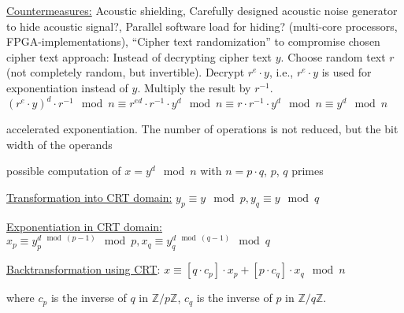 \documentclass[landscape, a4paper]{article}
\begin{document}
\begin{minipage}[t]{0.2\linewidth}
\begin{betterlist}
\begin{betterlist}
		\end{betterlist}
		\item \underline{Countermeasures:} Acoustic shielding, Carefully designed acoustic noise generator to hide acoustic signal?, Parallel software load for hiding? (multi-core processors, FPGA-implementations), \enquote{Cipher text randomization} to compromise chosen cipher text approach: Instead of decrypting cipher text $y$. Choose random text $r$ (not completely random, but invertible). Decrypt $r^e \cdot y$, i.e., $r^e \cdot y$ is used for exponentiation instead of $y$. Multiply the result by $r^{−1}$. $(r^e \cdot y)^d \cdot r^{−1} \mod n \equiv r^{ed} \cdot r^{−1} \cdot y^d \mod n \equiv r \cdot r^{−1} \cdot y^d \mod n \equiv y^d \mod n$
	\end{betterlist}
	\begin{betterlist}
		\item accelerated exponentiation. The number of operations is not reduced, but the bit width of the operands
		\item possible computation of $x = y^d \mod n$ with $n = p \cdot q$, $p$, $q$ primes
		\begin{betterlist}
			\item \underline{Transformation into CRT domain:} $y_p \equiv y \mod p, y_q \equiv y \mod q$
			\item \underline{Exponentiation in CRT domain:}\\
			$x_p \equiv y_p^{d \mod (p-1)} \mod p, x_q \equiv y_q^{d \mod (q-1)} \mod q$
			\item \underline{Backtransformation using CRT}: $x \equiv [q \cdot c_p] \cdot x_p + [p \cdot c_q] \cdot x_q \mod n$
			\begin{betterlist}
				\item where $c_p$ is the inverse of $q$ in $\mathbb{Z}/p\mathbb{Z}$, $c_q$ is the inverse of $p$ in $\mathbb{Z}/q\mathbb{Z}$.
			\end{betterlist}
		\end{betterlist}
	\end{betterlist}
\end{minipage}

\newpage
\end{document}
